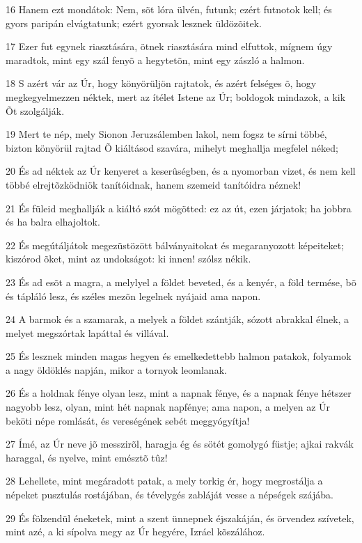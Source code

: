 \par 16 Hanem ezt mondátok: Nem, sõt lóra ülvén, futunk; ezért futnotok kell; és gyors paripán elvágtatunk; ezért gyorsak lesznek üldözõitek.
\par 17 Ezer fut egynek riasztására, ötnek riasztására mind elfuttok, mígnem úgy maradtok, mint egy szál fenyõ a hegytetõn, mint egy zászló a halmon.
\par 18 S azért vár az Úr, hogy könyörüljön rajtatok, és azért felséges õ, hogy megkegyelmezzen néktek, mert az ítélet Istene az Úr; boldogok mindazok, a kik Õt szolgálják.
\par 19 Mert te nép, mely Sionon Jeruzsálemben lakol, nem fogsz te sírni többé, bizton könyörül rajtad Õ kiáltásod szavára, mihelyt meghallja megfelel néked;
\par 20 És ad néktek az Úr kenyeret a keserûségben, és a nyomorban vizet, és nem kell többé elrejtõzködniök tanítóidnak, hanem szemeid tanítóidra néznek!
\par 21 És füleid meghallják a kiáltó szót mögötted: ez az út, ezen járjatok; ha jobbra és ha balra elhajoltok.
\par 22 És megútáljátok megezüstözött bálványaitokat és megaranyozott képeiteket; kiszórod õket, mint az undokságot: ki innen! szólsz nékik.
\par 23 És ad esõt a magra, a melylyel a földet beveted, és a kenyér, a föld termése, bõ és tápláló lesz, és széles mezõn legelnek nyájaid ama napon.
\par 24 A barmok és a szamarak, a melyek a földet szántják, sózott abrakkal élnek, a melyet megszórtak lapáttal és villával.
\par 25 És lesznek minden magas hegyen és emelkedettebb halmon patakok, folyamok a nagy öldöklés napján, mikor a tornyok leomlanak.
\par 26 És a holdnak fénye olyan lesz, mint a napnak fénye, és a napnak fénye hétszer nagyobb lesz, olyan, mint hét napnak napfénye; ama napon, a melyen az Úr beköti népe romlását, és vereségének sebét meggyógyítja!
\par 27 Ímé, az Úr neve jõ messzirõl, haragja ég és sötét gomolygó füstje; ajkai rakvák haraggal, és nyelve, mint emésztõ tûz!
\par 28 Lehellete, mint megáradott patak, a mely torkig ér, hogy megrostálja a népeket pusztulás rostájában, és tévelygés zabláját vesse a népségek szájába.
\par 29 És fölzendül éneketek, mint a szent ünnepnek éjszakáján, és örvendez szívetek, mint azé, a ki sípolva megy az Úr hegyére, Izráel kõszálához.
